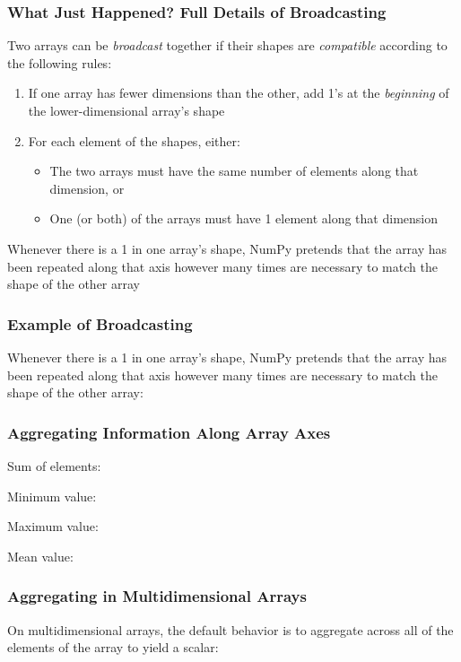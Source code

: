 \documentclass[xcolor={x11names,table}]{beamer}
\begin{document}
\begin{frame}
	\frametitle{What Just Happened? Full Details of Broadcasting}
	Two arrays can be \emph{broadcast} together if their shapes are \emph{compatible} according to the following rules:
	\begin{enumerate}
		\item If one array has fewer dimensions than the other, add 1's at the \emph{beginning} of the lower-dimensional array's shape
		\item For each element of the shapes, either:
		\begin{itemize}
			\item The two arrays must have the same number of elements along that dimension, or
			\item One (or both) of the arrays must have 1 element along that dimension
		\end{itemize}
	\end{enumerate}
	Whenever there is a 1 in one array's shape, NumPy pretends that the array has been repeated along that axis however many times are necessary to match the shape of the other array
\end{frame}

\begin{frame}
	\frametitle{Example of Broadcasting}
	Whenever there is a 1 in one array's shape, NumPy pretends that the array has been repeated along that axis however many times are necessary to match the shape of the other array:
	
\end{frame}

\begin{frame}
	\frametitle{Aggregating Information Along Array Axes}
	
	
	Sum of elements:
	
	
	Minimum value:
	
	
	Maximum value:
	
	
	Mean value:
	
\end{frame}

\begin{frame}
	\frametitle{Aggregating in Multidimensional Arrays}
	On multidimensional arrays, the default behavior is to aggregate across all of the elements of the array to yield a scalar:
	
\end{frame}
\end{document}
